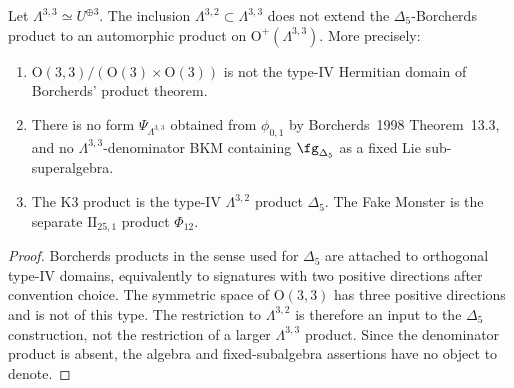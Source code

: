 \begin{theorem}
\label{thm:k3e-cy3-platonic-envelope}
Let \(\Lambda^{3,3}\simeq U^{\oplus3}\).  The inclusion
\(\Lambda^{3,2}\subset\Lambda^{3,3}\) does not extend the
\(\Delta_5\)-Borcherds product to an automorphic product on
\(\mathrm O^+(\Lambda^{3,3})\).  More precisely:
\begin{enumerate}[label=\textup{(\roman*)}]
\item \(\mathrm O(3,3)/(\mathrm O(3)\times\mathrm O(3))\) is not the
type-IV Hermitian domain of Borcherds' product theorem.
\item There is no form \(\Psi_{\Lambda^{3,3}}\) obtained from
\(\phi_{0,1}\) by Borcherds~1998 Theorem~13.3, and no
\(\Lambda^{3,3}\)-denominator BKM containing \(\fg_{\Delta_5}\) as a
fixed Lie sub-superalgebra.
\item The K3 product is the type-IV \(\Lambda^{3,2}\) product \(\Delta_5\).
The Fake Monster is the separate \(\mathrm{II}_{25,1}\) product
\(\Phi_{12}\).
\end{enumerate}
\end{theorem}

\begin{proof}
Borcherds products in the sense used for \(\Delta_5\) are attached to
orthogonal type-IV domains, equivalently to signatures with two positive
directions after convention choice.  The symmetric space of
\(\mathrm O(3,3)\) has three positive directions and is not of this type.
The restriction to \(\Lambda^{3,2}\) is therefore an input to the
\(\Delta_5\) construction, not the restriction of a larger
\(\Lambda^{3,3}\) product.  Since the denominator product is absent, the
algebra and fixed-subalgebra assertions have no object to denote.
\end{proof}

